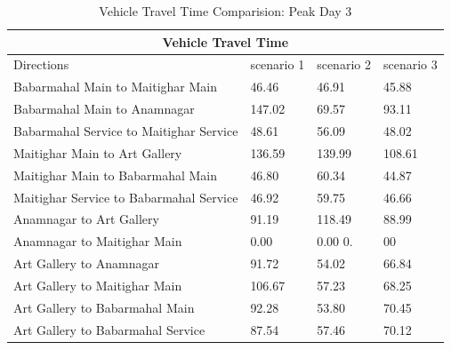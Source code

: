 \begin{table}[h!]
    \centering
    \caption{Vehicle Travel Time Comparision: Peak Day 3}
    \begin{tabular}{|l|l|l|l|}
         \hline
        \multicolumn{4}{|c|}{\textbf{Vehicle Travel Time}} \\
        \hline
        Directions &	scenario 1 &	scenario 2 &	scenario 3 \\
        \hline
         Babarmahal Main to Maitighar Main	& 46.46	&46.91	&45.88 \\
         \hline
        Babarmahal Main to Anamnagar	& 147.02&	69.57&	93.11 \\
        \hline
        Babarmahal Service to Maitighar Service	& 48.61	&56.09	&48.02 \\
        \hline
        Maitighar Main to Art Gallery	& 136.59&	139.99&	108.61 \\
        \hline
        Maitighar Main to Babarmahal Main	& 46.80	&60.34	&44.87 \\
        \hline
        Maitighar Service to Babarmahal Service	& 46.92	&59.75	&46.66 \\
        \hline
        Anamnagar to Art Gallery	& 91.19	&118.49&	88.99 \\
        \hline
        Anamnagar to Maitighar Main	& 0.00	&0.00	0.&00 \\
        \hline
        Art Gallery to Anamnagar	& 91.72	&54.02	&66.84 \\
        \hline
        Art Gallery to Maitighar Main	& 106.67&	57.23&	68.25 \\
        \hline
        Art Gallery to Babarmahal Main	& 92.28	&53.80	&70.45 \\
        \hline
        Art Gallery to Babarmahal Service	& 87.54	&57.46	&70.12 \\
        \hline
        
    \end{tabular}

\end{table}

